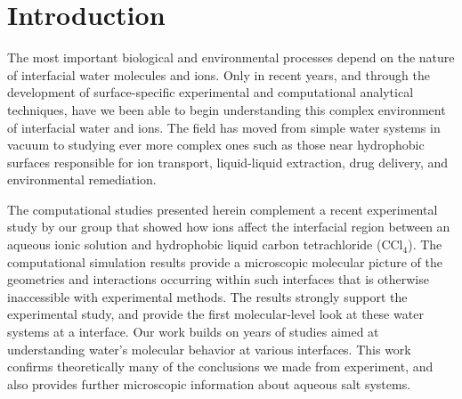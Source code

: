 \section{Introduction}

The most important biological and environmental processes depend on the nature of interfacial water molecules and ions. Only in recent years, and through the development of surface-specific experimental\cite{Charreteur2008,Chen2007,Luo2006,McArthur2006} and computational\cite{Schnell2004,Su2005,Wardle2005,Wick2008a} analytical techniques, have we been able to begin understanding this complex environment of interfacial water and ions. The field has moved from simple water systems in vacuum to studying ever more complex ones such as those near hydrophobic surfaces responsible for ion transport, liquid-liquid extraction, drug delivery, and environmental remediation.

The computational studies presented herein complement a recent experimental study by our group that showed how ions affect the interfacial region between an aqueous ionic solution and hydrophobic liquid carbon tetrachloride (CCl$_4$).\cite{McFearin2009} The computational simulation results provide a microscopic molecular picture of the geometries and interactions occurring within such interfaces that is otherwise inaccessible with experimental methods. The results strongly support the experimental study, and provide the first molecular-level look at these water systems at a \ctc interface. Our work builds on years of studies aimed at understanding water's molecular behavior at various interfaces. This work confirms theoretically many of the conclusions we made from experiment, and also provides further microscopic information about aqueous salt systems.

